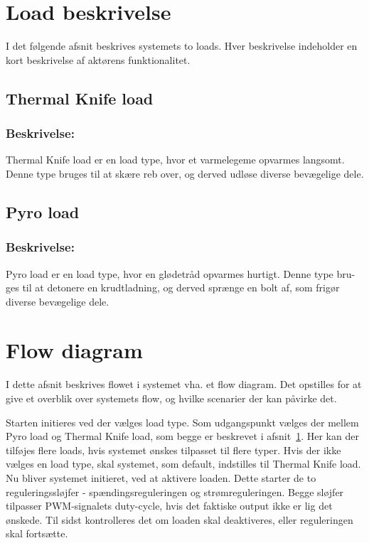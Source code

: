 \clearpage


\section{Load beskrivelse} \label{load_types}
I det følgende afsnit beskrives systemets to loads. Hver beskrivelse indeholder en kort beskrivelse af aktørens funktionalitet.


\begin{framed}
	\subsection{Thermal Knife load}

	\subsubsection*{Beskrivelse:}
	Thermal Knife load er en load type, hvor et varmelegeme opvarmes langsomt. \indent Denne type bruges til at skære reb over, og derved udløse diverse bevægelige \indent dele.
\end{framed}

\begin{framed}
	\subsection{Pyro load}
	
	\subsubsection*{Beskrivelse:}
	Pyro load er en load type, hvor en glødetråd opvarmes hurtigt. Denne type bru- \indent ges til at detonere en krudtladning, og derved sprænge en bolt af, som frigør \indent diverse bevægelige dele.
\end{framed}

\clearpage

\section{Flow diagram}
I dette afsnit beskrives flowet i systemet vha. et flow diagram. Det opstilles for at give et overblik over systemets flow, og hvilke scenarier der kan påvirke det. 

Starten initieres ved der vælges load type. Som udgangspunkt vælges der mellem Pyro load og Thermal Knife load, som begge er beskrevet i afsnit~\ref{load_types}. Her kan der tilføjes flere loads, hvis systemet ønskes tilpasset til flere typer. Hvis der ikke vælges en load type, skal systemet, som default, indstilles til Thermal Knife load. Nu bliver systemet initieret, ved at aktivere loaden. Dette starter de to reguleringssløjfer - spændingsreguleringen og strømreguleringen. Begge sløjfer tilpasser PWM-signalets duty-cycle, hvis det faktiske output ikke er lig det ønskede. Til sidst kontrolleres det om loaden skal deaktiveres, eller reguleringen skal fortsætte.


